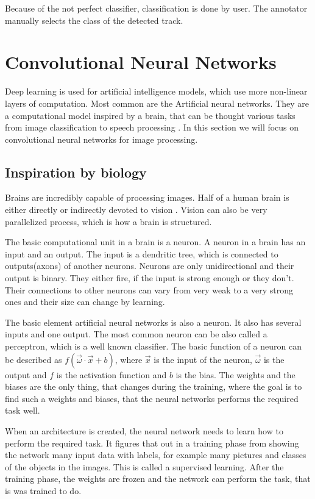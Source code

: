 \documentclass[a4paper,12pt,titlepage, twoside]{article}
\numberwithin{figure}{section}
\begin{document}
Because of the not perfect classifier, classification is done by user. The annotator manually selects the class of the detected track.


\clearpage
\section{Convolutional Neural Networks}

Deep learning is used for artificial intelligence models, which use more non-linear layers of computation. Most common are the Artificial neural networks. They are a computational model inspired by a brain, that can be thought various tasks from image classification \cite{szegedy2016rethinking} to speech processing \cite{graves2013speech}. In this section we will focus on convolutional neural networks for image processing.

\subsection{Inspiration by biology}
Brains are incredibly capable of processing images. Half of a human brain is either directly or indirectly devoted to vision \cite{mit-vision}. Vision can also be very parallelized process, which is how a brain is structured.

The basic computational unit in a brain is a neuron. A neuron in a brain has an input and an output. The input is a dendritic tree, which is connected to outputs(axons) of another neurons. Neurons are only unidirectional and their output is binary. They either fire, if the input is strong enough or they don't. Their connections to other neurons can vary from very weak to a very strong ones and their size can change by learning.

The basic element artificial neural networks is also a neuron. It also has several inputs and one output. The most common neuron can be also called a perceptron\cite{rosenblatt1958perceptron}, which is a well known classifier. The basic function of a neuron can be described as $f(\overrightarrow{\omega} \cdot \overrightarrow{x} + b)$, where $\overrightarrow{x}$ is the input of the neuron, $\overrightarrow{\omega}$ is the output and $f$ is the activation function and $b$ is the bias. The weights and the biases are the only thing, that changes during the training, where the goal is to find such a weights and biases, that the neural networks performs the required task well.

When an architecture is created, the neural network needs to learn how to perform the required task. It figures that out in a training phase from showing the network many input data with labels, for example many pictures and classes of the objects in the images. This is called a supervised learning. After the training phase, the weights are frozen and the network can perform the task, that is was trained to do.
\end{document}

